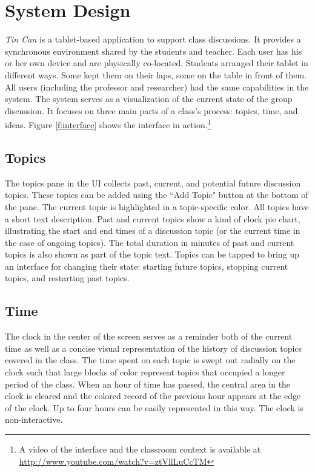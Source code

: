 
\section{System Design}
 
\emph{Tin Can} is a tablet-based application to support class discussions. It provides a synchronous environment shared by the students and teacher. Each user has his or her own device and are physically co-located. Students arranged their tablet in different ways. Some kept them on their laps, some on the table in front of them. All users (including the professor and researcher) had the same capabilities in the system. The system serves as a visualization of the current state of the group discussion. It focuses on three main parts of a class's process: topics, time, and ideas. Figure \ref{f:interface} shows the interface in action.\footnote{A video of the interface and the classroom context is available at \url{http://www.youtube.com/watch?v=ztVllLuCcTM}}

\subsection{Topics}
The topics pane in the UI collects past, current, and potential future discussion topics. These topics can be added using the ``Add Topic" button at the bottom of the pane. The current topic is highlighted in a topic-specific color. All topics have a short text description. Past and current topics show a kind of clock pie chart, illustrating the start and end times of a discussion topic (or the current time in the case of ongoing topics). The total duration in minutes of past and current topics is also shown as part of the topic text. Topics can be tapped to bring up an interface for changing their state: starting future topics, stopping current topics, and restarting past topics. 

\subsection{Time}
The clock in the center of the screen serves as a reminder both of the current time as well as a concise visual representation of the history of discussion topics covered in the class. The time spent on each topic is swept out radially on the clock such that large blocks of color represent topics that occupied a longer period of the class. When an hour of time has passed, the central area in the clock is cleared and the colored record of the previous hour appears at the edge of the clock. Up to four hours can be easily represented in this way. The clock is non-interactive. 


